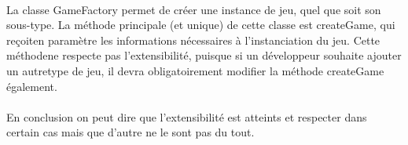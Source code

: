    \paragraph{}
        La classe GameFactory permet de créer une instance de jeu, quel que soit son sous-type. La méthode principale (et unique) de cette classe est createGame, qui reçoiten paramètre les informations nécessaires à l’instanciation du jeu. Cette méthodene respecte pas l’extensibilité, puisque si un développeur souhaite ajouter un autretype de jeu, il devra obligatoirement modifier la méthode createGame également.
        
    \paragraph{}
        En conclusion on peut dire que l'extensibilité est atteints et respecter dans certain cas mais que d'autre ne le sont pas du tout.